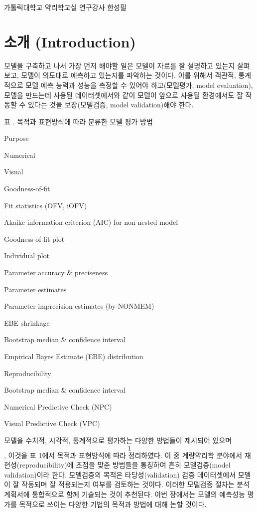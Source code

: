 \documentclass[
  10pt,
]{krantz}
\begin{document}
가톨릭대학교 약리학교실 연구강사 한성필

\hypertarget{uxc18cuxac1c-introduction}{%
\section{소개 (Introduction)}\label{uxc18cuxac1c-introduction}}

모델을 구축하고 나서 가장 먼저 해야할 일은 모델이 자료를 잘 설명하고 있는지 살펴보고, 모델이 의도대로 예측하고 있는지를
파악하는 것이다. 이를 위해서 객관적, 통계적으로 모델 예측 능력과 성능을 측정할 수 있어야 하고(모델평가,
model evaluation), 모델을 만드는데 사용된 데이터셋에서와 같이 모델이 앞으로 사용될 환경에서도 잘 작동할 수 있다는
것을 보장(모델검증, model validation)해야 한다.

표 . 목적과 표현방식에 따라 분류한 모델 평가 방법

Purpose

Numerical

Visual

Goodness-of-fit

Fit statistics (OFV, iOFV)

Akaike information criterion (AIC) for non-nested model

Goodness-of-fit plot

Individual plot

Parameter accuracy \& preciseness

Parameter estimates

Parameter imprecision estimates (by NONMEM)

EBE shrinkage

Bootstrap median \& confidence interval

Empirical Bayes Estimate (EBE) distribution

Reproducibility

Bootstrap median \& confidence interval

Numerical Predictive Check (NPC)

Visual Predictive Check (VPC)

모델을 수치적, 시각적, 통계적으로 평가하는 다양한 방법들이 제시되어 있으며 \[1\], 이것을 표 1에서 목적과 표현방식에 따라
정리하였다. 이 중 계량약리학 분야에서 재현성(reproducibility)에 초점을 맞춘 방법들을 통칭하여 흔히
모델검증(model validation)이라 한다. 모델검증의 목적은 타당성(validation) 검증 데이터셋에서
모델이 잘 작동되며 잘 적용되는지 여부를 검토하는 것이다. 이러한 모델검증 절차는 분석계획서에 통합적으로 함께 기술되는 것이
추천된다. 이번 장에서는 모델의 예측성능 평가를 목적으로 쓰이는 다양한 기법의 목적과 방법에 대해 논할 것이다.
\end{document}
